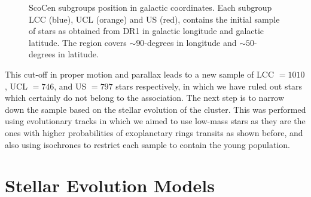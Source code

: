 \begin{figure}[!ht]
\centering
\caption{\scriptsize{ScoCen subgroups position in galactic coordinates. Each subgroup LCC (blue), UCL (orange) and US (red), contains the initial sample of stars as obtained from DR1 in galactic longitude and galactic latitude. The region covers $\sim 90$-degrees in longitude and $\sim 50$-degrees in latitude.}}
\label{fig:Projection_ScoCen}
\end{figure}

This cut-off in proper motion and parallax leads to a new sample of LCC $= 1010$, UCL $= 746$, and US $= 797$ stars respectively, in which we have ruled out stars which certainly do not belong to the association. The next step is to narrow down the sample based on the stellar evolution of the cluster. This was performed using evolutionary tracks in which we aimed to use low-mass stars as they are the ones with higher probabilities of exoplanetary rings transits as shown before, and also using isochrones to restrict each sample to contain the young population. %



\section{Stellar Evolution Models} \label{sec:SEM_1}

